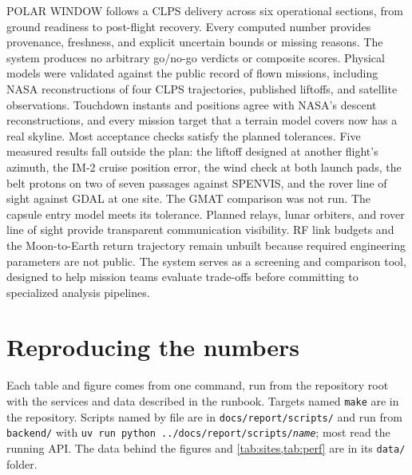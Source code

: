 \documentclass[11pt,a4paper]{article}
\begin{document}
POLAR WINDOW follows a CLPS delivery across six operational sections, from ground readiness
to post-flight recovery. Every computed number provides provenance, freshness, and explicit
uncertain bounds or missing reasons. The system produces no arbitrary go/no-go verdicts or
composite scores. Physical models were validated against the public record of flown missions,
including NASA reconstructions of four CLPS trajectories, published liftoffs, and satellite
observations. Touchdown instants and positions
agree with NASA's descent reconstructions, and every mission target that a terrain model covers
now has a real skyline. Most acceptance checks satisfy the planned tolerances. Five measured
results fall outside the plan: the liftoff designed at another flight's azimuth, the IM-2 cruise
position error, the wind check at both launch pads, the belt protons on two of seven passages
against SPENVIS, and the rover line of sight against GDAL at one site. The GMAT comparison was
not run. The capsule entry model meets its tolerance. Planned relays, lunar
orbiters, and rover line of sight provide transparent communication visibility. RF link budgets
and the Moon-to-Earth return trajectory remain unbuilt because required engineering parameters
are not public. The system serves as a screening and comparison tool, designed to help mission
teams evaluate trade-offs before committing to specialized analysis pipelines.




\appendix
\section{Reproducing the numbers}
\label{app:repro}

Each table and figure comes from one command, run from the repository root with the
services and data described in the runbook. Targets named \texttt{make} are in the
repository. Scripts named by file are in \texttt{docs/report/scripts/} and run from
\texttt{backend/} with \texttt{uv run python ../docs/report/scripts/\emph{name}}; most read the
running API. The data behind the figures and \cref{tab:sites,tab:perf} are in its
\texttt{data/} folder.
\end{document}
